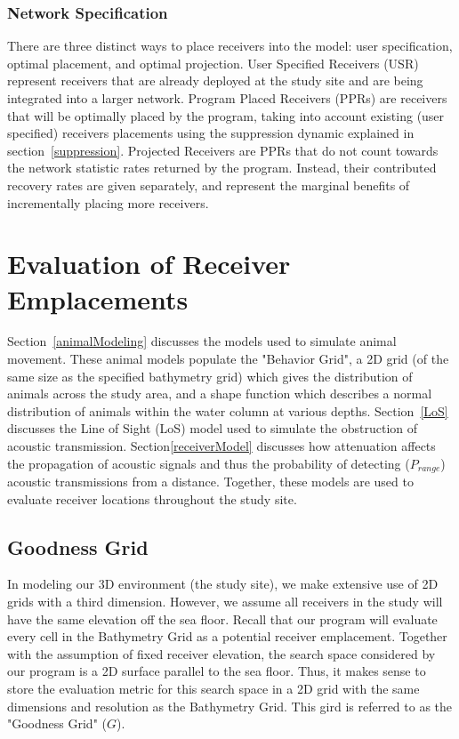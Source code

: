 \subsubsection{Network Specification}
There are three distinct ways to place receivers into the model: user specification, optimal placement, and optimal projection.  User Specified Receivers (USR) represent receivers that are already deployed at the study site and are being integrated into a larger network.    Program Placed Receivers (PPRs) are receivers that will be  optimally placed by the program, taking into account existing (user specified) receivers placements using the suppression dynamic explained in section~\ref{suppression}.  Projected Receivers are PPRs that do not count towards the network statistic rates returned by the program.  Instead, their contributed recovery rates are given separately, and represent the marginal benefits of incrementally placing more receivers.  


\section{Evaluation of Receiver Emplacements}
\label{evaluationOfReceiver}
Section~\ref{animalModeling} discusses the models used to simulate animal movement.  These animal models populate the "Behavior Grid", a 2D grid (of the same size as the specified bathymetry grid) which gives the distribution of animals across the study area, and a shape function which describes a normal distribution of animals within the water column at various depths.  Section~\ref{LoS} discusses the Line of Sight (LoS) model used to simulate the obstruction of acoustic transmission.  Section\ref{receiverModel} discusses how attenuation affects the propagation of acoustic signals and thus the probability of detecting ($P_{range}$) acoustic transmissions from a distance.  Together, these models are used to evaluate receiver locations throughout the study site.  


\subsection{Goodness Grid}
\label{goodnessGrid}
In modeling our 3D environment (the study site), we make extensive use of 2D grids with a third dimension.  However, we assume all receivers in the study will have the same elevation off the sea floor.  Recall that our program will evaluate every cell in the Bathymetry Grid as a potential receiver emplacement.  Together with the assumption of fixed receiver elevation, the search space considered by our program is a 2D surface parallel to the sea floor.  Thus, it makes sense to store the evaluation metric for this search space in a 2D grid with the same dimensions and resolution as the Bathymetry Grid.  This gird is referred to as the "Goodness Grid" ($G$).  

